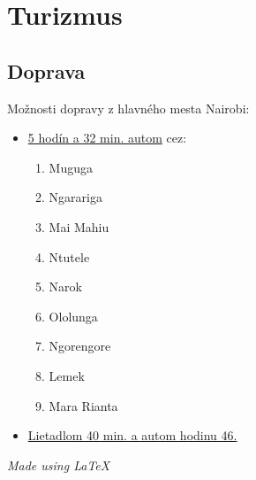 \documentclass{article}
\begin{document}
\begin{itemize}
\end{itemize}
\section{Turizmus}
\subsection{Doprava}
Možnosti dopravy z hlavného mesta Nairobi:\\
\begin{itemize}
\item \href{https://goo.gl/maps/aTAvHZeG1BvaFuyu7}{5 hodín a 32 min. autom} cez:
\begin{center}\begin{enumerate}\item Muguga\item Ngarariga \item Mai Mahiu \item Ntutele \item Narok \item Ololunga \item Ngorengore \item Lemek \item Mara Rianta\end{enumerate}\end{center}
\item \href{https://goo.gl/maps/yms58Dx5xudpooT78}{Lietadlom 40 min. a autom hodinu 46.}
\end{itemize}	



\textit{Made using \LaTeX{}}
\end{document}
